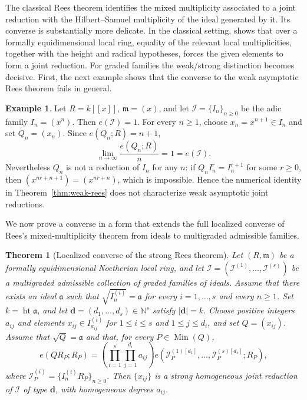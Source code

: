 \documentclass[reqno,12pt]{amsart}
\theoremstyle{plain}
\newtheorem{thm}[prop]{Theorem}
\theoremstyle{definition}
\newtheorem{ex}[prop]{Example}
\theoremstyle{remark}
\newtheorem{rem}[prop]{Remark}
\numberwithin{equation}{section}
\begin{document}
The classical Rees theorem identifies the mixed multiplicity associated
to a joint reduction with the Hilbert--Samuel multiplicity of the ideal
generated by it. Its converse is substantially more delicate. In the
classical setting, \cite[Theorem~17.6.1]{SwansonHuneke} shows that over a
formally equidimensional local ring, equality of the relevant local
multiplicities, together with the height and radical hypotheses, forces
the given elements to form a joint reduction. For graded families the
weak/strong distinction becomes decisive. First, the next example shows that  the converse to the weak asymptotic Rees theorem fails in general.

\begin{ex}
\label{ex:weak-converse}
Let $R=k[[x]]$, $\mathfrak m=(x)$, and let
$\mathcal I=\{I_n\}_{n\geq0}$ be the adic family $I_n=(x^n)$. Then
$e(\mathcal I)=1$. For every $n\geq1$, choose
$x_n=x^{n+1}\in I_n$ and set $Q_n=(x_n)$. Since
$e(Q_n;R)=n+1$,
\[
\lim_{n\to\infty}\frac{e(Q_n;R)}{n}
=1=e(\mathcal I).
\]
Nevertheless $Q_n$ is not a reduction of $I_n$ for any $n$: if
$Q_nI_n^r=I_n^{r+1}$ for some $r\geq0$, then
$(x^{nr+n+1})=(x^{nr+n})$, which is impossible. Hence the numerical
identity in Theorem~\ref{thm:weak-rees} does not characterize weak
asymptotic joint reductions.
\end{ex}


We now prove a converse in a form that extends the full localized
converse of Rees's mixed-multiplicity theorem from ideals to
multigraded admissible families.

\begin{thm}[Localized converse of the strong Rees theorem]
\label{thm:localized-strong-converse}
Let $(R,\mathfrak m)$ be a formally equidimensional Noetherian local
ring, and let
$\boldsymbol{\mathcal I}
=(\mathcal I^{(1)},\ldots,\mathcal I^{(s)})$
be a multigraded admissible collection of graded families of ideals.
Assume that there exists an ideal $\mathfrak a$ such that
$\sqrt{I_n^{(i)}}=\mathfrak a$ for every $i=1,\ldots,s$ and every
$n\geq1$. Set $k=\operatorname{ht}\mathfrak a$, and let
$\mathbf d=(d_1,\ldots,d_s)\in\mathbb N^s$ satisfy $|\mathbf d|=k$. Choose positive integers $a_{ij}$ and elements
$x_{ij}\in I_{a_{ij}}^{(i)}$ for
$1\leq i\leq s$ and $1\leq j\leq d_i$, and set $Q=(x_{ij})$.
Assume that $\sqrt Q=\mathfrak a$ and that, for every
$P\in\operatorname{Min}(Q)$,
\[
e(QR_P;R_P)
=
\left(\prod_{i=1}^{s}\prod_{j=1}^{d_i}a_{ij}\right)
e\!\left(
\mathcal I_P^{(1)[d_1]},\ldots,
\mathcal I_P^{(s)[d_s]};R_P
\right),
\]
where $\mathcal I_P^{(i)}=\{I_n^{(i)}R_P\}_{n\geq0}$.
Then $\{x_{ij}\}$ is a strong homogeneous joint reduction of
$\boldsymbol{\mathcal I}$ of type $\mathbf d$, with homogeneous degrees
$a_{ij}$.
\end{thm}
\end{document}
